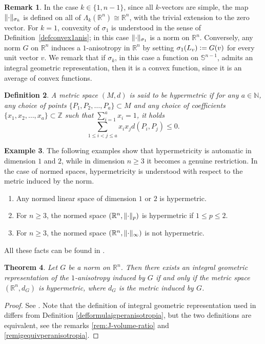 \documentclass{article}
\numberwithin{equation}{section}
\theoremstyle{plain}%
\newtheorem{theorem}{Theorem}[section]
\newtheorem{defin}[theorem]{Definition}
\theoremstyle{definition}
\newtheorem{rem}[theorem]{Remark}
\newtheorem{es}[theorem]{Example}
\theoremstyle{definition}
\newcommand{\rgrande}{\mathbb{R}}
\newcommand{\ngrande}{\mathbb{N}}
\newcommand{\zgrande}{\mathbb{Z}}
\newcommand{\sfera}{\mathbb{S}}
\newcommand{\vettgen}[2]{\Lambda_{#1}(\rgrande^{#2})}
\DeclarePairedDelimiter{\norma}{\lVert}{\rVert} %
\begin{document}
\begin{rem}
In the case $k \in \{ 1, n-1 \}$, since all $k$-vectors are simple, the map $\norma{\cdot}_{\sigma_k}$ is defined on all of $\vettgen{k}{n}\cong \rgrande^n$, with the trivial extension to the zero vector. For $k=1$, convexity of $\sigma_1$ is understood in the sense of Definition~\ref{defconvex1anis}; in this case $\norma{\cdot}_{\sigma_1}$ is a norm on $\rgrande^n$. Conversely, any norm $G$ on $\rgrande^n$ induces a $1$-anisotropy in $\rgrande^n$ by setting $\sigma_1 (L_v) \vcentcolon = G (v)$ for every unit vector $v$. We remark that if $\sigma_k$, in this case a function on $\sfera^{n-1}$, admits an integral geometric representation, then it is a convex function, since it is an average of convex functions.
\end{rem}

\begin{defin}\label{defspazioipermetrico}
    A metric space $(M,d)$ is said to be hypermetric if for any $a \in \ngrande$, any choice of points $\{ P_1, P_2, \ldots, P_a \} \subset M$ and any choice of coefficients $\{ x_1, x_2, \ldots, x_a \} \subset \zgrande$ such that
    $\sum_{i=1}^{a} x_i = 1$, it holds
    $$
    \sum_{1 \leq i < j \leq a} x_i x_j d(P_i,P_j) \leq 0 \text{.}
    $$
\end{defin}
\begin{es}\label{exspaziipermetrici}
The following examples show that hypermetricity is automatic in dimension $1$ and $2$, while in dimension $n\geq 3$ it becomes a genuine restriction. In the case of normed spaces, hypermetricity is understood with respect to the metric induced by the norm.
\begin{enumerate}
    \item\label{exdimensione1o2}
    Any normed linear space of dimension $1$ or $2$ is hypermetric.

    \item
    For $n \geq 3$, the normed space $(\rgrande^n, \norma{\cdot}_p)$ is hypermetric if $1 \leq p \leq 2$.

    \item\label{exnonipermetrico}
    For $n \geq 3$, the normed space $(\rgrande^n, \norma{\cdot}_{\infty})$ is not hypermetric.
\end{enumerate}
All these facts can be found in \cite[Chapter 3]{MR405367}. 
\end{es}

\begin{theorem}\label{thigpernormainrn}
     Let $G$ be a norm on $\rgrande^n$. Then there exists an integral geometric representation of the $1$-anisotropy induced by $G$ if and only if the metric space $(\rgrande^n, d_G)$ is hypermetric, where $d_G$ is the metric induced by $G$.
\end{theorem}
\begin{proof}
    See \cite[Rem. 4.1]{MR1462734}. Note that the definition of integral geometric representation used in \cite{MR1462734} differs from Definition \ref{defformulaigperanisotropia}, but the two definitions are equivalent, see the remarks \ref{rem:J-volume-ratio} and \ref{remigequivperanisotropia}.
\end{proof}
\end{document}
